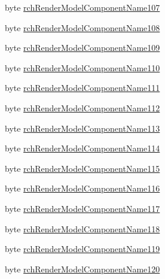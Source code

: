 \begin{DoxyCompactItemize}
\item 
byte \mbox{\hyperlink{struct_valve_1_1_v_r_1_1_input_origin_info__t_abce88c218d1d9799fbfb3c6951382139}{rch\+Render\+Model\+Component\+Name107}}
\item 
byte \mbox{\hyperlink{struct_valve_1_1_v_r_1_1_input_origin_info__t_ad18d25edec1cdd303857e5e560e5f249}{rch\+Render\+Model\+Component\+Name108}}
\item 
byte \mbox{\hyperlink{struct_valve_1_1_v_r_1_1_input_origin_info__t_a498eeda45d31b66c6b215e79d1053bcc}{rch\+Render\+Model\+Component\+Name109}}
\item 
byte \mbox{\hyperlink{struct_valve_1_1_v_r_1_1_input_origin_info__t_a307cd0cf206955484bf6c0307a7afd95}{rch\+Render\+Model\+Component\+Name110}}
\item 
byte \mbox{\hyperlink{struct_valve_1_1_v_r_1_1_input_origin_info__t_a237969378157565a95c2580f924d8d9a}{rch\+Render\+Model\+Component\+Name111}}
\item 
byte \mbox{\hyperlink{struct_valve_1_1_v_r_1_1_input_origin_info__t_ac3f2af05af798e5377ad5127ce5f7eef}{rch\+Render\+Model\+Component\+Name112}}
\item 
byte \mbox{\hyperlink{struct_valve_1_1_v_r_1_1_input_origin_info__t_a69401d83a05749b5970951e04d4fc5c7}{rch\+Render\+Model\+Component\+Name113}}
\item 
byte \mbox{\hyperlink{struct_valve_1_1_v_r_1_1_input_origin_info__t_a19f987d50ee5f59543a1f859a12b636e}{rch\+Render\+Model\+Component\+Name114}}
\item 
byte \mbox{\hyperlink{struct_valve_1_1_v_r_1_1_input_origin_info__t_a0f893de9ee3f900d88afd7b0c315f968}{rch\+Render\+Model\+Component\+Name115}}
\item 
byte \mbox{\hyperlink{struct_valve_1_1_v_r_1_1_input_origin_info__t_a805e106f6913b1e8e612257070d677cf}{rch\+Render\+Model\+Component\+Name116}}
\item 
byte \mbox{\hyperlink{struct_valve_1_1_v_r_1_1_input_origin_info__t_a25addd0b809d264ba5525317db61f3c7}{rch\+Render\+Model\+Component\+Name117}}
\item 
byte \mbox{\hyperlink{struct_valve_1_1_v_r_1_1_input_origin_info__t_a349bab856b467a44fad967994890575b}{rch\+Render\+Model\+Component\+Name118}}
\item 
byte \mbox{\hyperlink{struct_valve_1_1_v_r_1_1_input_origin_info__t_ae2b0f98253a99462200f97a50db1022f}{rch\+Render\+Model\+Component\+Name119}}
\item 
byte \mbox{\hyperlink{struct_valve_1_1_v_r_1_1_input_origin_info__t_a309f7ade890a312558c48452031904aa}{rch\+Render\+Model\+Component\+Name120}}

\end{DoxyCompactItemize}
